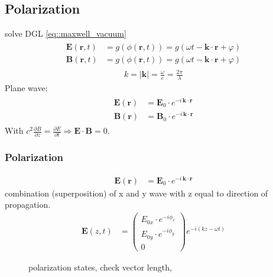 \subsection{Polarization}
% 
solve DGL \ref{eq::maxwell_vacuum}
% 
\begin{align}
\begin{split} \label{eq::dgl_solution}
   \mathbf{E}( \mathbf{r}, t ) &= g(\phi( \mathbf{r}, t )) = g( \omega t - \mathbf{k} \cdot \mathbf{r} + \varphi)\\
   \mathbf{B}( \mathbf{r}, t ) &= g(\phi( \mathbf{r}, t )) = g( \omega t - \mathbf{k} \cdot \mathbf{r} + \varphi )
\end{split}
\end{align}
% 
\begin{align}
k = \mathopen| \mathbf{k} \mathclose| = \frac{\omega}{c} =  \frac{2 \pi}{\lambda}
\end{align}
% 
Plane wave:
\begin{align}
\begin{split} \label{eq::plane_wave}
\mathbf{E}(\mathbf{r}) &= \mathbf{E}_0 \cdot e^{ -i \, \mathbf{k} \cdot \mathbf{r} }\\
 \mathbf{B}(\mathbf{r}) &= \mathbf{B}_0 \cdot e^{ -i \, \mathbf{k} \cdot \mathbf{r} }
\end{split}
\end{align}
% 
With $c^2  \frac{\partial B} {\partial z} = \frac{\partial E}{\partial t} \Rightarrow \mathbf{E} \cdot \mathbf{B} = 0$.
% 
\subsubsection{Polarization}
% 
\begin{align}
\mathbf{E}(\mathbf{r}) &= \mathbf{E}_0 \cdot e^{ -i \, \mathbf{k} \cdot \mathbf{r}}
\end{align}
% 
combination (superposition) of x and y wave with z equal to direction of propagation.
\begin{align}
\mathbf{E}(z,t) &= \begin{pmatrix} E_{0x} \cdot e^{ -i \phi_x } \\ E_{0y} \cdot e^{ -i \phi_y } \\ 0 \end{pmatrix}
e^{ -i (kz - \omega t)}
\end{align}
%
\begin{figure}[!t]
\centering
\tikzset{external/export=false}

\caption{polarization states, check vector length, } 
\end{figure}
%
